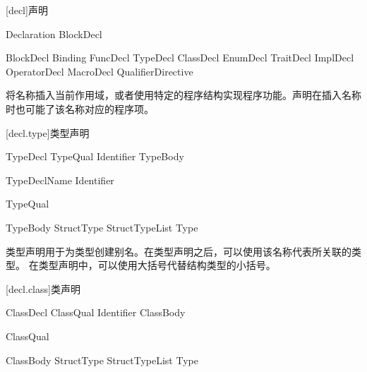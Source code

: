 
[decl]{声明}

\begin{bnf}{Declaration}
    BlockDecl
\end{bnf}

\begin{bnf}{BlockDecl}
    Binding \br
    FuncDecl \br
    TypeDecl \br
    ClassDecl \br
    EnumDecl \br
    TraitDecl \br
    ImplDecl \br
    OperatorDecl \br
    MacroDecl \br
    QualifierDirective
\end{bnf}

\pnum
{}将名称插入当前作用域，或者使用特定的程序结构实现程序功能。声明在插入名称时也可能了该名称对应的程序项。

[decl.type]{类型声明}

\begin{bnf}{TypeDecl}
    TypeQual\bnfs {} Identifier TypeBody
\end{bnf}

\begin{bnf}{TypeDeclName}
    Identifier \br
\end{bnf}

\begin{bnf}{TypeQual}
\end{bnf}

\begin{bnf}{TypeBody}
    StructType \br
    \terminal{\{} \terminal{\}} \br
    \terminal{\{} StructTypeList \terminal{,}\bnfq \terminal{\}} \br
    \terminal{=} Type
\end{bnf}

\pnum
类型声明用于为类型创建别名。在类型声明之后，可以使用该名称代表所关联的类型。
在类型声明中，可以使用大括号代替结构类型的小括号。

[decl.class]{类声明}

\begin{bnf}{ClassDecl}
    ClassQual\bnfs {} Identifier ClassBody
\end{bnf}

\begin{bnf}{ClassQual}
\end{bnf}

\begin{bnf}{ClassBody}
    StructType \br
    \terminal{\{} \terminal{\}} \br
    \terminal{\{} StructTypeList \terminal{,}\bnfq \terminal{\}} \br
    \terminal{=} Type
\end{bnf}

